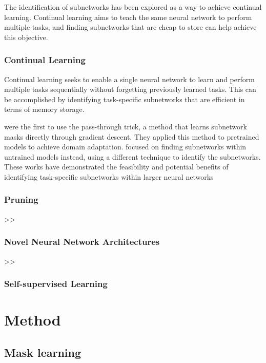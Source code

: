 \documentclass{article}
\begin{document}
    The identification of subnetworks has been explored as a way to achieve continual learning. Continual learning aims to teach the same neural network to perform multiple tasks, and finding subnetworks that are cheap to store can help achieve this objective.

    \subsubsection{Continual Learning}

    Continual learning seeks to enable a single neural network to learn and perform multiple tasks sequentially without forgetting previously learned tasks. This can be accomplished by identifying task-specific subnetworks that are efficient in terms of memory storage.

    \citeauthor{mallyaPiggybackAdaptingSingle2018} were the first to use the pass-through trick, a method that learns subnetwork masks directly through gradient descent. They applied this method to pretrained models to achieve domain adaptation. \citeauthor{wortsmanSupermasksSuperposition} focused on finding subnetworks within untrained models instead, using a different technique to identify the subnetworks. These works have demonstrated the feasibility and potential benefits of identifying task-specific subnetworks within larger neural networks


    \subsubsection{Pruning}
    >>

    \subsubsection{Novel Neural Network Architectures}
    >>
    \cite{wortsmanSupermasksSuperposition}
    \subsubsection{Self-supervised Learning}


    \section{Method}

    \subsection{Mask learning}
\end{document}
